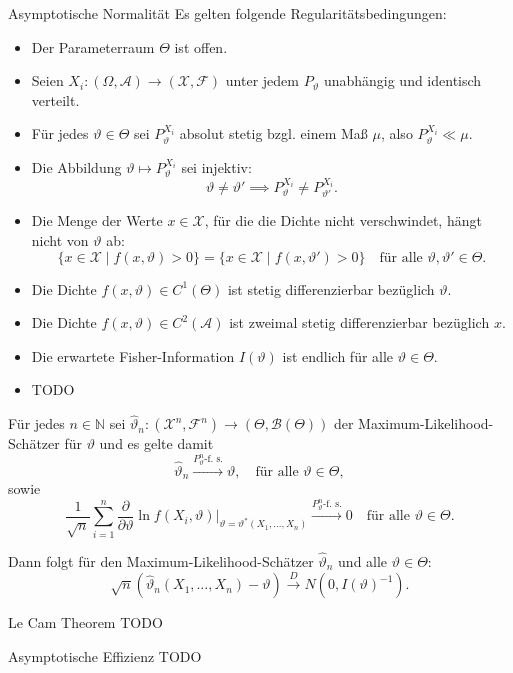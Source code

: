 \begin{defi}{Asymptotische Normalität}
    Es gelten folgende Regularitätsbedingungen:
    \begin{itemize}
        \item Der Parameterraum $\Theta$ ist offen.
        \item Seien $X_i: (\Omega, \mathcal{A}) \to (\mathcal{X}, \mathcal{F})$ unter jedem $P_{\vartheta}$ unabhängig und identisch verteilt.
        \item Für jedes $\vartheta \in \Theta$ sei $P_{\vartheta}^{X_i}$ absolut stetig bzgl. einem Maß $\mu$, also $P_{\vartheta}^{X_i} \ll \mu$.
        \item Die Abbildung $\vartheta \mapsto P_{\vartheta}^{X_i}$ sei injektiv:
              \[
                  \vartheta \neq \vartheta' \implies P_{\vartheta}^{X_i} \neq P_{\vartheta'}^{X_i}.
              \]
        \item Die Menge der Werte $x \in \mathcal{X}$, für die die Dichte nicht verschwindet, hängt nicht von $\vartheta$ ab:
              \[
                  \{ x \in \mathcal{X} \mid f(x, \vartheta) > 0 \} = \{ x \in \mathcal{X} \mid f(x, \vartheta') > 0 \} \quad \text{für alle } \vartheta, \vartheta' \in \Theta.
              \]
        \item Die Dichte $f(x, \vartheta) \in C^1(\Theta)$ ist stetig differenzierbar bezüglich $\vartheta$.
        \item Die Dichte $f(x, \vartheta) \in C^2(\mathcal{A})$ ist zweimal stetig differenzierbar bezüglich $x$.
        \item Die erwartete Fisher-Information $I(\vartheta)$ ist endlich für alle $\vartheta \in \Theta$.
        \item TODO
    \end{itemize}

    Für jedes $n \in \mathbb{N}$ sei $\hat{\vartheta}_n: (\mathcal{X}^n, \mathcal{F}^n) \to (\Theta, \mathcal{B}(\Theta))$ der Maximum-Likelihood-Schätzer für $\vartheta$ und es gelte damit
    \[
        \hat{\vartheta}_n \xrightarrow{P_{\vartheta}^n\text{-f. s.}} \vartheta, \quad \text{für alle } \vartheta \in \Theta,
    \]
    sowie
    \[
        \frac{1}{\sqrt{n}} \sum_{i=1}^n \frac{\partial}{\partial \vartheta} \ln f(X_i, \vartheta) \Big|_{\vartheta = \vartheta^*(X_1, \dotsc, X_n)} \xrightarrow{P_{\vartheta}^n\text{-f. s.}} 0 \quad \text{für alle } \vartheta \in \Theta.
    \]

    Dann folgt für den Maximum-Likelihood-Schätzer $\hat{\vartheta}_n$ und alle $\vartheta \in \Theta$:
    \[
        \sqrt{n} (\hat{\vartheta}_n(X_1, \dotsc, X_n) - \vartheta) \xrightarrow{D} N(0, I(\vartheta)^{-1}).
    \]
\end{defi}

\begin{defi}{Le Cam Theorem}
    TODO
\end{defi}

\begin{defi}{Asymptotische Effizienz}
    TODO
\end{defi}